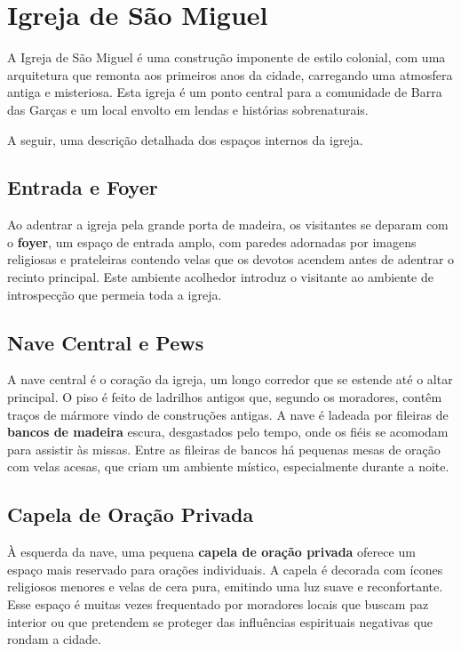 \section{Igreja de São Miguel}

A Igreja de São Miguel é uma construção imponente de estilo colonial, com uma arquitetura que remonta aos primeiros anos da cidade, carregando uma atmosfera antiga e misteriosa. Esta igreja é um ponto central para a comunidade de Barra das Garças e um local envolto em lendas e histórias sobrenaturais. 

A seguir, uma descrição detalhada dos espaços internos da igreja.

\subsection{Entrada e Foyer}

Ao adentrar a igreja pela grande porta de madeira, os visitantes se deparam com o \textbf{foyer}, um espaço de entrada amplo, com paredes adornadas por imagens religiosas e prateleiras contendo velas que os devotos acendem antes de adentrar o recinto principal. Este ambiente acolhedor introduz o visitante ao ambiente de introspecção que permeia toda a igreja.

\subsection{Nave Central e Pews}

A nave central é o coração da igreja, um longo corredor que se estende até o altar principal. O piso é feito de ladrilhos antigos que, segundo os moradores, contêm traços de mármore vindo de construções antigas. A nave é ladeada por fileiras de \textbf{bancos de madeira} escura, desgastados pelo tempo, onde os fiéis se acomodam para assistir às missas. Entre as fileiras de bancos há pequenas mesas de oração com velas acesas, que criam um ambiente místico, especialmente durante a noite.

\subsection{Capela de Oração Privada}

À esquerda da nave, uma pequena \textbf{capela de oração privada} oferece um espaço mais reservado para orações individuais. A capela é decorada com ícones religiosos menores e velas de cera pura, emitindo uma luz suave e reconfortante. Esse espaço é muitas vezes frequentado por moradores locais que buscam paz interior ou que pretendem se proteger das influências espirituais negativas que rondam a cidade.

